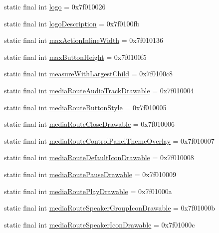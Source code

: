 \begin{CompactItemize}
static final int \hyperlink{classandroid_1_1support_1_1mediacompat_1_1_r_1_1attr_4221aefb526be98c00e2ea5a070f1b06}{logo} = 0x7f010026
\item 
static final int \hyperlink{classandroid_1_1support_1_1mediacompat_1_1_r_1_1attr_58b67763c19a3b84ff3f81473e75b009}{logoDescription} = 0x7f0100fb
\item 
static final int \hyperlink{classandroid_1_1support_1_1mediacompat_1_1_r_1_1attr_6cf00d1a952d26907671561e77becb90}{maxActionInlineWidth} = 0x7f010136
\item 
static final int \hyperlink{classandroid_1_1support_1_1mediacompat_1_1_r_1_1attr_ab46480afbce51e266e53532de37a7fe}{maxButtonHeight} = 0x7f0100f5
\item 
static final int \hyperlink{classandroid_1_1support_1_1mediacompat_1_1_r_1_1attr_891ef086e2da37c7de16b89999737c65}{measureWithLargestChild} = 0x7f0100c8
\item 
static final int \hyperlink{classandroid_1_1support_1_1mediacompat_1_1_r_1_1attr_fab1b46895d235aa2129dc6bb024c4c1}{mediaRouteAudioTrackDrawable} = 0x7f010004
\item 
static final int \hyperlink{classandroid_1_1support_1_1mediacompat_1_1_r_1_1attr_84c713fae18406c22f6aff287b9e8dc0}{mediaRouteButtonStyle} = 0x7f010005
\item 
static final int \hyperlink{classandroid_1_1support_1_1mediacompat_1_1_r_1_1attr_4aea01262b12d3208a98f9cb95070465}{mediaRouteCloseDrawable} = 0x7f010006
\item 
static final int \hyperlink{classandroid_1_1support_1_1mediacompat_1_1_r_1_1attr_954d582a13e6f7d8e0213d1d58586a02}{mediaRouteControlPanelThemeOverlay} = 0x7f010007
\item 
static final int \hyperlink{classandroid_1_1support_1_1mediacompat_1_1_r_1_1attr_bab959578b3a4e6856d894d9cdb22ab5}{mediaRouteDefaultIconDrawable} = 0x7f010008
\item 
static final int \hyperlink{classandroid_1_1support_1_1mediacompat_1_1_r_1_1attr_fa0de083f149c3d626f6aba7fcf2f8f4}{mediaRoutePauseDrawable} = 0x7f010009
\item 
static final int \hyperlink{classandroid_1_1support_1_1mediacompat_1_1_r_1_1attr_c816ac5237fab43452bb4c5e009f9f26}{mediaRoutePlayDrawable} = 0x7f01000a
\item 
static final int \hyperlink{classandroid_1_1support_1_1mediacompat_1_1_r_1_1attr_e2019cd778ce65a2ef29a052a86e40f1}{mediaRouteSpeakerGroupIconDrawable} = 0x7f01000b
\item 
static final int \hyperlink{classandroid_1_1support_1_1mediacompat_1_1_r_1_1attr_0dbac20b8a410e542755b2c0b796bf60}{mediaRouteSpeakerIconDrawable} = 0x7f01000c

\end{CompactItemize}
